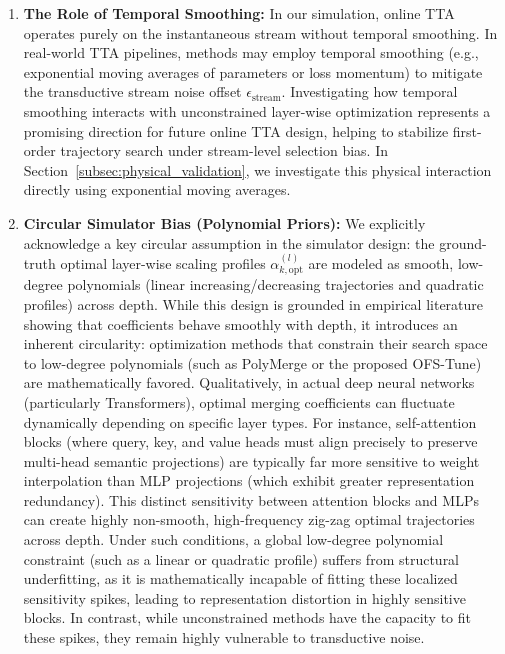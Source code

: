 \begin{enumerate}
Thus, this optimization asymmetry highlights a major, inherent engineering advantage of offline tuning.
In Section~\ref{subsec:opt_asymmetry}, we rigorously deconstruct and standardize this asymmetry empirically, demonstrating that it does not affect our findings.
    \item \textbf{The Role of Temporal Smoothing:} In our simulation, online TTA operates purely on the instantaneous stream without temporal smoothing.
In real-world TTA pipelines, methods may employ temporal smoothing (e.g., exponential moving averages of parameters or loss momentum) to mitigate the transductive stream noise offset $\epsilon_{\text{stream}}$.
Investigating how temporal smoothing interacts with unconstrained layer-wise optimization represents a promising direction for future online TTA design, helping to stabilize first-order trajectory search under stream-level selection bias.
In Section~\ref{subsec:physical_validation}, we investigate this physical interaction directly using exponential moving averages.
    \item \textbf{Circular Simulator Bias (Polynomial Priors):} We explicitly acknowledge a key circular assumption in the simulator design: the ground-truth optimal layer-wise scaling profiles $\alpha_{k, \text{opt}}^{(l)}$ are modeled as smooth, low-degree polynomials (linear increasing/decreasing trajectories and quadratic profiles) across depth.
While this design is grounded in empirical literature showing that coefficients behave smoothly with depth, it introduces an inherent circularity: optimization methods that constrain their search space to low-degree polynomials (such as PolyMerge or the proposed OFS-Tune) are mathematically favored.
Qualitatively, in actual deep neural networks (particularly Transformers), optimal merging coefficients can fluctuate dynamically depending on specific layer types.
For instance, self-attention blocks (where query, key, and value heads must align precisely to preserve multi-head semantic projections) are typically far more sensitive to weight interpolation than MLP projections (which exhibit greater representation redundancy).
This distinct sensitivity between attention blocks and MLPs can create highly non-smooth, high-frequency zig-zag optimal trajectories across depth.
Under such conditions, a global low-degree polynomial constraint (such as a linear or quadratic profile) suffers from structural underfitting, as it is mathematically incapable of fitting these localized sensitivity spikes, leading to representation distortion in highly sensitive blocks.
In contrast, while unconstrained methods have the capacity to fit these spikes, they remain highly vulnerable to transductive noise.

\end{enumerate}
